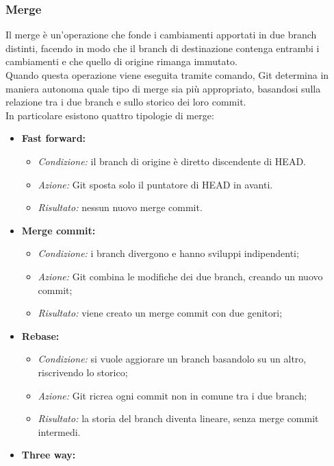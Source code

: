\documentclass[12pt]{article}
\begin{document}
    \subsubsection{Merge}
    Il merge è un'operazione che fonde i cambiamenti apportati in due branch distinti, facendo in modo che il branch di destinazione contenga entrambi i cambiamenti e che quello di origine rimanga immutato.\\
    Quando questa operazione viene eseguita tramite comando, Git determina in maniera autonoma quale tipo di merge sia più appropriato, basandosi sulla relazione tra i due branch e sullo storico dei loro commit.\\
    In particolare esistono quattro tipologie di merge:
    \begin{itemize}
      \item \textbf{Fast forward:}
        \begin{itemize}
          \item \textit{Condizione:} il branch di origine è diretto discendente di HEAD.
          \item \textit{Azione:} Git sposta solo il puntatore di HEAD in avanti. 
          \item \textit{Risultato:} nessun nuovo merge commit. 
        \end{itemize}
      \item \textbf{Merge commit:}
        \begin{itemize}
          \item \textit{Condizione:} i branch divergono e hanno sviluppi indipendenti;
          \item \textit{Azione:} Git combina le modifiche dei due branch, creando un nuovo commit;
          \item \textit{Risultato:} viene creato un merge commit con due genitori;
        \end{itemize}
      \item \textbf{Rebase:}
        \begin{itemize}
          \item \textit{Condizione:} si vuole aggiorare un branch basandolo su un altro, riscrivendo lo storico;
          \item \textit{Azione:} Git ricrea ogni commit non in comune tra i due branch; 
          \item \textit{Risultato:} la storia del branch diventa lineare, senza merge commit intermedi. 
        \end{itemize}
      \item \textbf{Three way:}

\end{itemize}
\end{document}

